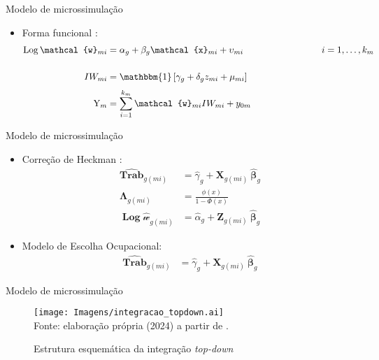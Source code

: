 \documentclass[10pt]{sintefbeamer}
\DeclareMathOperator\Log{Log}
\begin{document}
\begin{frame}{Modelo de microssimulação}
	\begin{itemize}[<+->]
		\item Forma funcional \cite{bourguignon05}:
		\begin{align}
			\Log \mathcal{w}_{mi}  &= \alpha_{g} + \beta_{g} \mathcal{x}_{mi} + \upsilon_{mi} \hspace{3cm} i = 1, \ldots, k_m \label{eq:renda} \\[0.5cm]
			IW_{mi}                &= \mathbbm{1} \left[\gamma_{g} + \delta_{g} z_{mi} + \mu_{mi} \right] \label{eq:ocm} \\[0.1cm]
			\text{Y}_{m}           &= \sum_{i = 1}^{k_{m}} \mathcal{w}_{mi} IW_{mi} + y_{0m} \label{eq:renda_familiar}
		\end{align}
	\end{itemize}
\end{frame}

\begin{frame}{Modelo de microssimulação}
	\begin{itemize}[<+->]
		\item Correção de Heckman \cite{heckman79}:
		\begin{align}
			\boldsymbol{\hat{Trab}}_{g(mi)} &= \hat{\gamma}_g + \mathbf{X}_{g(mi)} \ \boldsymbol{\hat{\beta}}_g \label{eq:step1} \\
	\boldsymbol{\Lambda}_{g(mi)}    &= \frac{\phi(x)}{1 - \Phi(x)} \label{eq:mills} \\
			\mathbf{\Log \mathcal{\hat{w}}}_{g(mi)} &= \hat{\alpha}_g + \mathbf{Z}_{g(mi)} \ \boldsymbol{\hat{\beta}}_g \label{eq:step2}
		\end{align}

		\item Modelo de Escolha Ocupacional:
		\begin{align}
			\boldsymbol{\hat{Trab}}_{g(mi)} &= \hat{\gamma}_g + \mathbf{X}_{g(mi)} \ \boldsymbol{\hat{\beta}}_g \tag{4} \label{eq:step1}
		\end{align}
	\end{itemize}
\end{frame}

\begin{frame}{Modelo de microssimulação}
	\begin{figure}
		\caption{Estrutura esquemática da integração \textit{top-down}}
		\texttt{[image: Imagens/integracao\_topdown.ai]} \\
		\footnotesize
		Fonte: elaboração própria (2024) a partir de \textcite{tiberti17}.
	\end{figure}
\end{frame}
\end{document}
